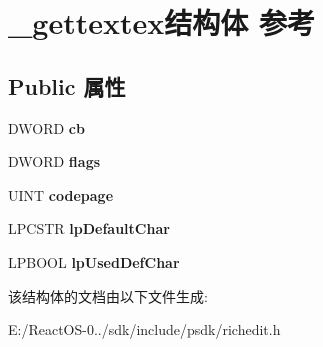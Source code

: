 \hypertarget{struct__gettextex}{}\section{\+\_\+gettextex结构体 参考}
\label{struct__gettextex}
\subsection*{Public 属性}
\begin{DoxyCompactItemize}
\item 
\mbox{\label{struct__gettextex_a0f87c32e6cf870e38270c3a8ff54dc16}} 
D\+W\+O\+RD {\bfseries cb}
\item 
\mbox{\label{struct__gettextex_a514e556a559f1aee0d033377dd62c15e}} 
D\+W\+O\+RD {\bfseries flags}
\item 
\mbox{\label{struct__gettextex_ae976ae90ce42a3c78643e75244e45dab}} 
U\+I\+NT {\bfseries codepage}
\item 
\mbox{\label{struct__gettextex_abd890c2c044e811e7c33bc31fbd99adf}} 
L\+P\+C\+S\+TR {\bfseries lp\+Default\+Char}
\item 
\mbox{\label{struct__gettextex_acd876fd0924476d6798e15edd9d818e6}} 
L\+P\+B\+O\+OL {\bfseries lp\+Used\+Def\+Char}
\end{DoxyCompactItemize}


该结构体的文档由以下文件生成\+:\begin{DoxyCompactItemize}
\item 
E\+:/\+React\+O\+S-\/0../sdk/include/psdk/richedit.\+h\end{DoxyCompactItemize}
